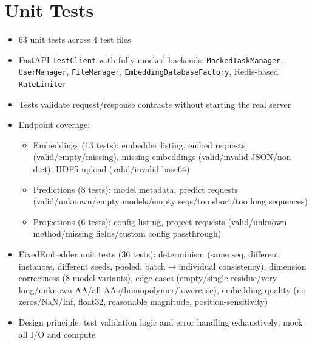 \section{Unit Tests}\label{sec:unit-tests}
\begin{itemize}
  \item 63 unit tests across 4 test files
  \item FastAPI \texttt{TestClient} with fully mocked backends: \texttt{MockedTaskManager}, \texttt{UserManager}, \texttt{FileManager}, \texttt{EmbeddingDatabaseFactory}, Redis-based \texttt{RateLimiter}
  \item Tests validate request/response contracts without starting the real server
  \item Endpoint coverage:
    \begin{itemize}
      \item Embeddings (13 tests): embedder listing, embed requests (valid/empty/missing), missing embeddings (valid/invalid JSON/non-dict), HDF5 upload (valid/invalid base64)
      \item Predictions (8 tests): model metadata, predict requests (valid/unknown/empty models/empty seqs/too short/too long sequences)
      \item Projections (6 tests): config listing, project requests (valid/unknown method/missing fields/custom config passthrough)
    \end{itemize}
  \item FixedEmbedder unit tests (36 tests): determinism (same seq, different instances, different seeds, pooled, batch$\to$individual consistency), dimension correctness (8 model variants), edge cases (empty/single residue/very long/unknown AA/all AAs/homopolymer/lowercase), embedding quality (no zeros/NaN/Inf, float32, reasonable magnitude, position-sensitivity)
  \item Design principle: test validation logic and error handling exhaustively; mock all I/O and compute
\end{itemize}


